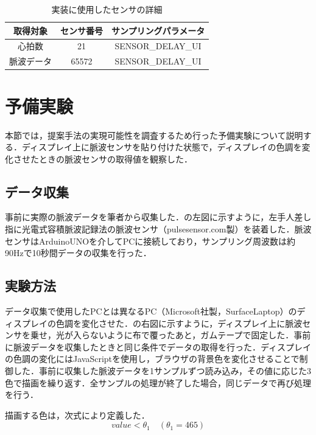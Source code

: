 \documentclass[Japanese,noauthor]{dicomopapers}
\begin{document}
\begin{table}[!t]
  \centering
  \caption{実装に使用したセンサの詳細}
  \begin{tabular}{c|c|c} \hline\hline
    取得対象 & センサ番号 & サンプリングパラメータ \\ \hline
    心拍数 & 21 & SENSOR\_DELAY\_UI \\
    脈波データ & 65572 & SENSOR\_DELAY\_UI \\ \hline
  \end{tabular}
  \label{tab:sensor_param}
\end{table}



\section{予備実験}
\label{sec:preliminary}
本節では，提案手法の実現可能性を調査するため行った予備実験について説明する．ディスプレイ上に脈波センサを貼り付けた状態で，ディスプレイの色調を変化させたときの脈波センサの取得値を観察した．


\subsection{データ収集}
事前に実際の脈波データを筆者から収集した．の左図に示すように，左手人差し指に光電式容積脈波記録法の脈波センサ（pulsesensor.com製）を装着した．脈波センサはArduinoUNOを介してPCに接続しており，サンプリング周波数は約90Hzで10秒間データの収集を行った．

\subsection{実験方法}
データ収集で使用したPCとは異なるPC（Microsoft社製，SurfaceLaptop）のディスプレイの色調を変化させた．の右図に示すように，ディスプレイ上に脈波センサを乗せ，光が入らないように布で覆ったあと，ガムテープで固定した．事前に脈波データを収集したときと同じ条件でデータの取得を行った．ディスプレイの色調の変化にはJavaScriptを使用し，ブラウザの背景色を変化させることで制御した．事前に収集した脈波データを1サンプルずつ読み込み，その値に応じた3色で描画を繰り返す．全サンプルの処理が終了した場合，同じデータで再び処理を行う．
\par

描画する色は，次式により定義した．
\begin{equation}
	\label{eqn:low}
	value < \theta_{1} \quad (\theta_{1}=465)
\end{equation}
\end{document}
